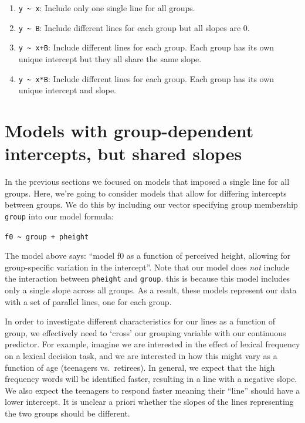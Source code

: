 \documentclass[
]{book}
\providecommand{\tightlist}{%
  \setlength{\itemsep}{0pt}\setlength{\parskip}{0pt}}
\begin{document}
\begin{enumerate}
\def\labelenumi{\arabic{enumi})}
\tightlist
\item
  \texttt{y\ \textasciitilde{}\ x}: Include only one single line for all groups.
\item
  \texttt{y\ \textasciitilde{}\ B}: Include different lines for each group but all slopes are 0.
\item
  \texttt{y\ \textasciitilde{}\ x+B}: Include different lines for each group. Each group has its own unique intercept but they all share the same slope.
\item
  \texttt{y\ \textasciitilde{}\ x*B}: Include different lines for each group. Each group has its own unique intercept and slope.
\end{enumerate}

\hypertarget{models-with-group-dependent-intercepts-but-shared-slopes}{%
\section{Models with group-dependent intercepts, but shared slopes}\label{models-with-group-dependent-intercepts-but-shared-slopes}}

In the previous sections we focused on models that imposed a single line for all groups. Here, we're going to consider models that allow for differing intercepts between groups. We do this by including our vector specifying group membership \texttt{group} into our model formula:

\texttt{f0\ \textasciitilde{}\ group\ +\ pheight}

The model above says: ``model f0 as a function of perceived height, allowing for group-specific variation in the intercept''. Note that our model does \emph{not} include the interaction between \texttt{pheight} and \texttt{group}. this is because this model includes only a single slope across all groups. As a result, these models represent our data with a set of parallel lines, one for each group.

In order to investigate different characteristics for our lines as a function of group, we effectively need to `cross' our grouping variable with our continuous predictor. For example, imagine we are interested in the effect of lexical frequency on a lexical decision task, and we are interested in how this might vary as a function of age (teenagers vs.~retirees). In general, we expect that the high frequency words will be identified faster, resulting in a line with a negative slope. We also expect the teenagers to respond faster meaning their ``line'' should have a lower intercept. It is unclear a priori whether the slopes of the lines representing the two groups should be different.
\end{document}
